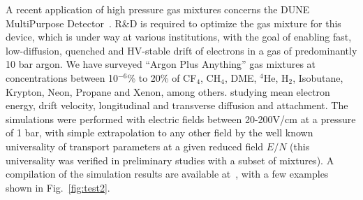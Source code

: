 \documentclass[3p,11pt]{elsarticle}
\begin{document}
A recent application of high pressure gas mixtures concerns the DUNE MultiPurpose Detector~\cite{Martin-Albo:2016tfh}.  R\&D is required to optimize the gas mixture for this device, which is under way at various institutions, with the goal of enabling fast, low-diffusion, quenched and HV-stable drift of electrons in a gas of predominantly 10 bar argon.  We have surveyed ``Argon Plus Anything'' gas mixtures at concentrations between 10$^{-6}$\% to 20\% of CF$_4$, CH$_4$, DME, $^4$He, H$_2$, Isobutane, Krypton, Neon, Propane and Xenon, among others. studying mean electron energy, drift velocity, longitudinal and transverse diffusion and attachment.  The simulations were performed with electric fields between 20-200V/cm at a pressure of 1 bar, with simple extrapolation to any other field by the well known universality of transport parameters at a given reduced field $E/N$ (this universality was verified in preliminary studies with a subset of mixtures).  A compilation of the simulation results are available at~\cite{GitHubPlusAny}, with a few examples shown in Fig.~\ref{fig:test2}.



\clearpage
\end{document}
